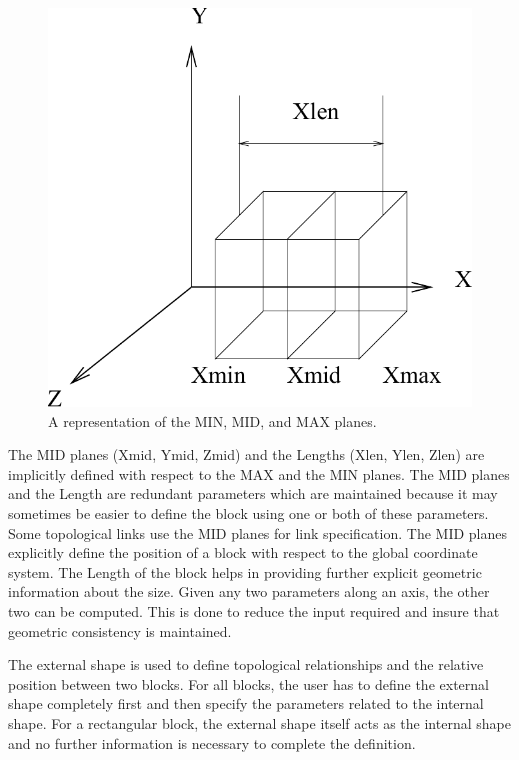 		\begin{figure}[htbp]
 			\includegraphics{IYAD16.pdf}
  			\caption{A representation of the MIN, MID, and MAX planes.}
  			\label{Iyad16}
		\end{figure}


	The MID planes (Xmid, Ymid, Zmid) and the Lengths (Xlen, Ylen, Zlen) are 
	implicitly defined with respect to the MAX and the MIN planes. 
	The MID planes and the Length are redundant parameters which are maintained 
	because
	it may sometimes be easier to define the
	block using one or both of these parameters. Some topological
	links use the MID planes for link specification. The MID planes 
	explicitly define the position of a block with respect to the global 
	coordinate system.
	The Length of the block helps in providing further explicit geometric
	information about the size. Given any two parameters along an axis, the 
	other two can be 
	computed. This is done to reduce the input required and insure that
	geometric consistency is maintained. 

	The external shape is used to define topological relationships and 
	the relative position between two blocks. For all blocks, the user has to 
	define the external shape completely first and then specify the parameters 
	related to the internal shape. For a rectangular block, the external shape 
	itself acts as the internal shape and no further information is necessary 	
	to complete the definition.

